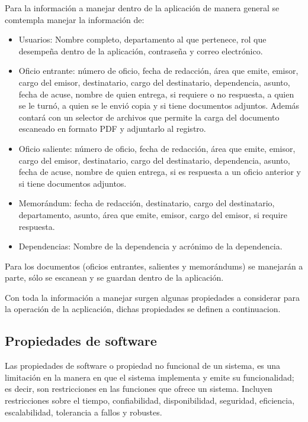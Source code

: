 Para la información a manejar dentro de la aplicación de manera general se comtempla manejar la información de:
\begin{itemize}
	\item Usuarios: Nombre completo, departamento al que pertenece, rol que desempeña dentro de la aplicación, contraseña y correo electrónico.
	\item Oficio entrante: número de oficio, fecha de redacción, área que emite, emisor, cargo del emisor, destinatario, cargo del destinatario, dependencia, asunto, fecha de acuse, nombre de quien entrega, si requiere o no respuesta, a quien se le turnó, a quien se le envió copia y si tiene documentos adjuntos. Además contará con un selector de archivos que permite la carga del documento escaneado en formato PDF y adjuntarlo al registro.
	\item Oficio saliente: número de oficio, fecha de redacción, área que emite, emisor, cargo del emisor, destinatario, cargo del destinatario, dependencia, asunto, fecha de acuse, nombre de quien entrega, si es respuesta a un oficio anterior y si tiene documentos adjuntos.
	\item Memorándum: fecha de redacción, destinatario, cargo del destinatario, departamento, asunto, área que emite, emisor, cargo del emisor, si require respuesta.  
	\item Dependencias: Nombre de la dependencia y acrónimo de la dependencia.
\end{itemize}

Para los documentos (oficios entrantes, salientes y memorándums) se manejarán a parte, sólo se escanean y se guardan dentro de la aplicación. 

Con toda la información a manejar surgen algunas propiedades a considerar para la operación de la acplicación, dichas propiedades se definen a continuacion.\\

\subsection{Propiedades de software}

Las propiedades de software o propiedad no funcional de un sistema, es una limitación en la manera en que el sistema implementa y emite su funcionalidad; es decir, son restricciones en las funciones que ofrece un sistema. Incluyen restricciones sobre el tiempo, confiabilidad, disponibilidad, seguridad, eficiencia, escalabilidad, tolerancia a fallos y robustes. \\

